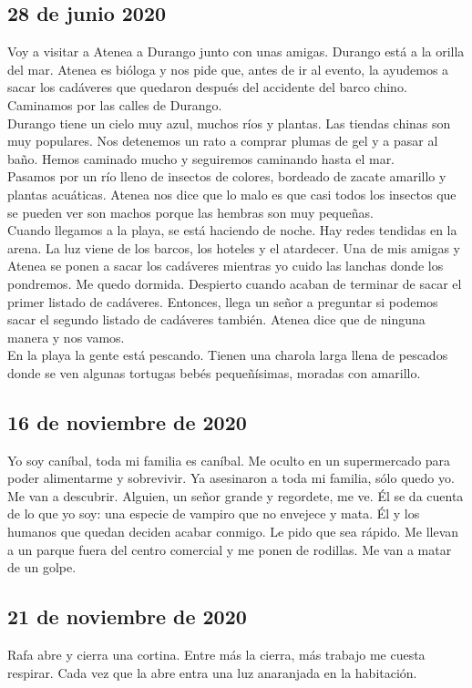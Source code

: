 \documentclass[12pt]{book}
\begin{document}
\subsection*{\hfill 28 de junio 2020}
Voy a visitar a Atenea a Durango junto con unas amigas. Durango está a la orilla del mar. 
Atenea es bióloga y nos pide que, antes de ir al evento, 
la ayudemos a sacar los cadáveres que quedaron después del accidente del barco chino. 
Caminamos por las calles de Durango. 
\\
Durango tiene un cielo muy azul, muchos ríos y plantas. Las tiendas chinas son muy populares. 
Nos detenemos un rato a comprar plumas de gel y a pasar al baño.  
Hemos caminado mucho y seguiremos caminando hasta el mar.
\\
Pasamos por un río lleno de insectos de colores,
 bordeado de zacate amarillo y plantas acuáticas. 
 Atenea nos dice que lo malo es que casi todos los insectos 
 que se pueden ver son machos porque las hembras son muy pequeñas. 
 \\
Cuando llegamos a la playa, se está haciendo de noche. Hay redes tendidas en la arena. La luz viene de los barcos, los hoteles y el atardecer. Una de mis amigas y Atenea se ponen a sacar los cadáveres mientras yo cuido las lanchas donde los pondremos. Me quedo dormida. Despierto cuando acaban de terminar de sacar el primer listado de cadáveres. Entonces, llega un señor a preguntar si podemos sacar el segundo listado de cadáveres también. Atenea dice que de ninguna manera y nos vamos. \\
En la playa la gente está pescando. Tienen una charola larga llena de pescados donde se ven algunas tortugas bebés pequeñísimas, moradas con amarillo.


\subsection*{\hfill 16 de noviembre de 2020}
Yo soy caníbal, toda mi familia es caníbal. Me oculto en un supermercado para poder alimentarme y sobrevivir. Ya asesinaron a toda mi familia, sólo quedo yo. Me van a descubrir. Alguien, un señor grande y regordete, me ve. Él se da cuenta de lo que yo soy: una especie de vampiro que no envejece y mata. Él y los humanos que quedan deciden acabar conmigo. Le pido que sea rápido. 
Me llevan a un parque fuera del centro comercial y me ponen de rodillas. Me van a matar de un golpe.  

\subsection*{\hfill 21 de noviembre de 2020}
Rafa abre y cierra una cortina. Entre más la cierra, más trabajo me cuesta respirar. Cada vez que la abre entra una luz anaranjada en la habitación.
\end{document}
